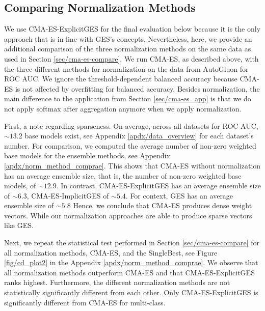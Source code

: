 \documentclass[11pt]{article}
\newcommand{\nbc}[3]{
		{\colorbox{#3}{\bfseries\sffamily\scriptsize\textcolor{white}{#1}}}
		{\textcolor{#3}{\sf\small$\blacktriangleright$\textit{#2}$\blacktriangleleft$}}
}
\newcommand{\changed}[1]{\nbc{CHANGED}{#1}{changedcolor}}
\renewcommand{\changed}[1]{{\color{changedcolor}#1}}
\renewcommand{\changed}[1]{{#1}}
\begin{document}
\subsection{Comparing Normalization Methods}
\label{sec/compare_norm}
We use CMA-ES-ExplicitGES for the final evaluation below because it is the only approach that is in line with GES's concepts.
Nevertheless, here, we \changed{provide an additional comparison of} the three normalization methods on the same data as used in Section \ref{sec/cma-es-compare}. We run CMA-ES, as described above, with the three different methods for normalization on the data from AutoGluon for ROC AUC. 
We ignore the threshold-dependent balanced accuracy because CMA-ES is not affected by overfitting for balanced accuracy. 
Besides normalization, the main difference to the application from Section \ref{sec/cma-es_app} is that we do not apply softmax after aggregation anymore when we apply normalization. 

First, a note regarding sparseness.
On average, across all datasets for ROC AUC, ${\sim}13.2$ base models exist\changed{, see Appendix \ref{apdx/data_overview} for each dataset's number}.  
\changed{For comparison, we computed the average number of non-zero weighted base models for the ensemble methods, see Appendix \ref{apdx/norm_method_comprae}.
This shows} that CMA-ES without normalization has an average ensemble size, that is, the number of non-zero weighted base models, of ${\sim}12.9$. 
In contrast, CMA-ES-ExplicitGES has an average ensemble size of ${\sim}6.3$, CMA-ES-ImplicitGES of ${\sim}5.4$. For context, GES has an average ensemble size of ${\sim}5.8$
Hence, we conclude that CMA-ES produces dense weight vectors.
While our normalization approaches are able to produce sparse vectors like GES. 

Next, we repeat the statistical test performed in Section \ref{sec/cma-es-compare} for all normalization methods, CMA-ES, and the SingleBest, see Figure \ref{fig/cd_plot2} in the Appendix \ref{apdx/norm_method_comprae}.
We observe that all normalization methods outperform CMA-ES and that CMA-ES-ExplicitGES ranks highest.
Furthermore, the different normalization methods are not statistically significantly different from each other. 
Only CMA-ES-ExplicitGES is significantly different from CMA-ES for multi-class.  
\end{document}
